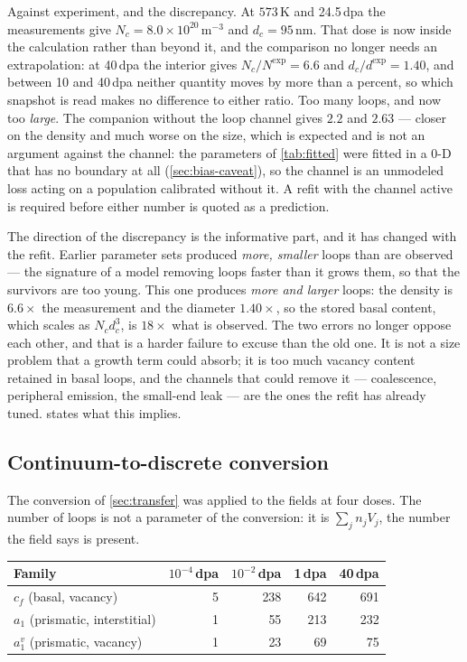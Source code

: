Against experiment, and the discrepancy. At $573\,$K and 24.5\,dpa
the measurements give $N_c=8.0\times10^{20}\,\mathrm{m^{-3}}$ and
$d_c=95\,$nm. That dose is now inside the calculation rather than beyond it,
and the comparison no longer needs an extrapolation: at 40\,dpa the interior
gives $N_c/N^{\exp}=6.6$ and $d_c/d^{\exp}=1.40$, and between 10 and 40\,dpa
neither quantity moves by more than a percent, so which snapshot is read makes
no difference to either ratio. Too many loops, and now too \emph{large}. The
companion without the loop channel gives $2.2$ and $2.63$ --- closer on the
density and much worse on the size, which is expected and is not an argument against the channel: the
parameters of \cref{tab:fitted} were fitted in a $0$-D that has no boundary at
all (\cref{sec:bias-caveat}), so the channel is an unmodeled loss acting on a
population calibrated without it. A refit with the channel active is required
before either number is quoted as a prediction.

The direction of the discrepancy is the informative part, and it has changed
with the refit. Earlier parameter sets produced \emph{more, smaller} \cloop{}
loops than are observed --- the signature of a model removing loops faster than
it grows them, so that the survivors are too young. This one produces
\emph{more and larger} loops: the density is $6.6\times$ the measurement and
the diameter $1.40\times$, so the stored basal content, which scales as
$N_c d_c^{3}$, is $18\times$ what is observed. The two errors no longer oppose
each other, and that is a harder failure to excuse than the old one. It is not a
size problem that a growth term could absorb; it is too much vacancy content
retained in basal loops, and the channels that could remove it --- coalescence,
peripheral emission, the small-end leak --- are the ones the refit has already
tuned.  states what
this implies.

\subsection{Continuum-to-discrete conversion}
\label{sec:results-discrete}

The conversion of \cref{sec:transfer} was applied to the fields at four doses.
The number of loops is not a parameter of the conversion: it is
$\sum_j n_j V_j$, the number the field says is present.

\begin{center}
\begin{tabular}{@{}lrrrr@{}}
\toprule
Family & $10^{-4}$\,dpa & $10^{-2}$\,dpa & 1\,dpa & 40\,dpa \\
\midrule
$c_f$ (basal, vacancy)          & 5 & 238 & 642 & 691 \\
$a_1$ (prismatic, interstitial) & 1 &  55 & 213 & 232 \\
$a_1^{v}$ (prismatic, vacancy)  & 1 &  23 &  69 &  75 \\
\bottomrule
\end{tabular}
\end{center}

